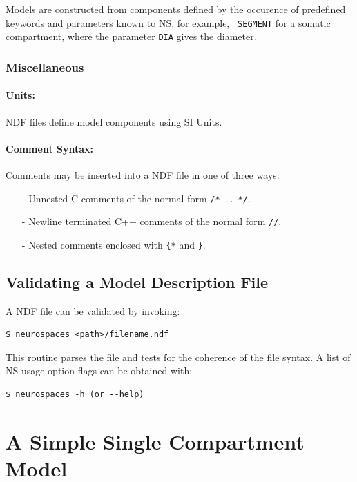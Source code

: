 \documentclass[12pt]{article}
\begin{document}
Models are constructed from components defined by the occurence of
predefined keywords and parameters known to NS, for example, {\tt
  SEGMENT} for a somatic compartment, where the parameter {\tt DIA}
gives the diameter.

\subsubsection{Miscellaneous}

\paragraph{Units:} NDF files define model components using SI Units.

\paragraph{Comment Syntax:}  Comments may be inserted into a NDF file in one of three ways:

\begin{itemize}
\item[-] Unnested C comments of the normal form {\tt /* $\ldots$ */}.
\item[-] Newline terminated C++ comments of the normal form {\tt //}.
\item[-] Nested comments enclosed with {\tt \{*} and {\tt *\}}.
\end{itemize}

\subsection{Validating a Model Description File}

A NDF file can be validated by invoking:

\begin{verbatim}
$ neurospaces <path>/filename.ndf
\end{verbatim}

This routine parses the file and tests for the coherence of the file
syntax. A list of NS usage option flags can be obtained with:
\begin{verbatim}
$ neurospaces -h (or --help)
\end{verbatim}

\section{A Simple Single Compartment Model}
\label{sec:simple-single-comp}
\end{document}
